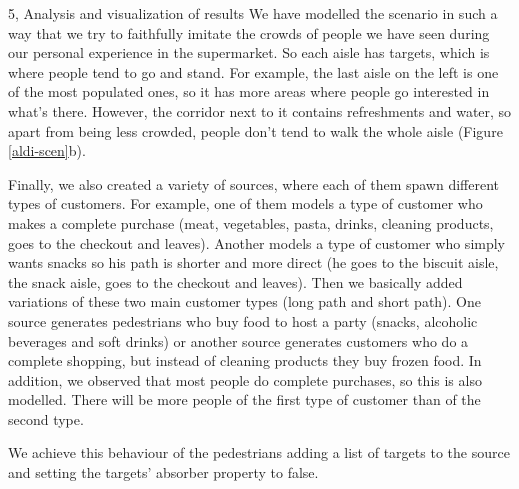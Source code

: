 \begin{task}{5, Analysis and visualization of results}
We have modelled the scenario in such a way that we try to faithfully imitate the crowds of people we have seen during our personal experience in the supermarket. So each aisle has targets, which is where people tend to go and stand. For example, the last aisle on the left is one of the most populated ones, so it has more areas where people go interested in what's there. However, the corridor next to it contains refreshments and water, so apart from being less crowded, people don't tend to walk the whole aisle (Figure \ref{aldi-scen}b).

Finally, we also created a variety of sources, where each of them spawn different types of customers. For example, one of them models a type of customer who makes a complete purchase (meat, vegetables, pasta, drinks, cleaning products, goes to the checkout and leaves). Another models a type of customer who simply wants snacks so his path is shorter and more direct (he goes to the biscuit aisle, the snack aisle, goes to the checkout and leaves). Then we basically added variations of these two main customer types (long path and short path). One source generates pedestrians who buy food to host a party (snacks, alcoholic beverages and soft drinks) or another source generates customers who do a complete shopping, but instead of cleaning products they buy frozen food. In addition, we observed that most people do complete purchases, so this is also modelled. There will be more people of the first type of customer than of the second type.

We achieve this behaviour of the pedestrians adding a list of targets to the source and setting the targets' absorber property to false.


\end{task}
